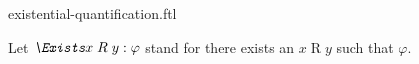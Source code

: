 \documentclass{stex}
\begin{document}
\begin{smodule}{existential-quantification.ftl}



\begin{fakeforthel}
  \begin{convention}[for=Exists]
    Let $\emph{\Exists} x \mathrel{R} y : \varphi$ stand for there exists an $x \mathrel{R} y$ such that $\varphi$.
  \end{convention}
\end{fakeforthel}

\end{smodule}
\end{document}
